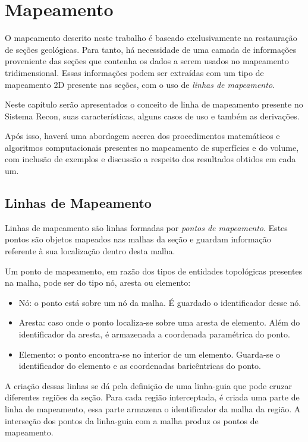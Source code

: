 
\chapter{Mapeamento}

O mapeamento descrito neste trabalho é baseado exclusivamente na restauração de seções geológicas. Para tanto, há necessidade de uma camada de informações proveniente das seções que contenha os dados a serem usados no mapeamento tridimensional. Essas informações podem ser extraídas com um tipo de mapeamento 2D presente nas seções, com o uso de \textit{linhas de mapeamento}.

Neste capítulo serão apresentados o conceito de linha de mapeamento presente no Sistema Recon, suas características, alguns casos de uso e também as derivações.

Após isso, haverá uma abordagem acerca dos procedimentos matemáticos e algoritmos computacionais presentes no mapeamento de superfícies e do volume, com inclusão de exemplos e discussão a respeito dos resultados obtidos em cada um.

\section{Linhas de Mapeamento}

Linhas de mapeamento são linhas formadas por \textit{pontos de mapeamento}. Estes pontos são objetos mapeados nas malhas da seção e guardam informação referente à sua localização dentro desta malha.

Um ponto de mapeamento, em razão dos tipos de entidades topológicas presentes na malha, pode ser do tipo nó, aresta ou elemento:

\renewcommand{\labelitemi}{•}
\begin{itemize}
  \item Nó: o ponto está sobre um nó da malha. É guardado o identificador desse nó.
  \item Aresta: caso onde o ponto localiza-se sobre uma aresta de elemento. Além do identificador da aresta, é armazenada a coordenada paramétrica do ponto.
  \item Elemento: o ponto encontra-se no interior de um elemento. Guarda-se o identificador do elemento e as coordenadas baricêntricas do ponto.
\end{itemize}

A criação dessas linhas se dá pela definição de uma linha-guia que pode cruzar diferentes regiões da seção. Para cada região interceptada, é criada uma parte de linha de mapeamento, essa parte armazena o identificador da malha da região. A interseção dos pontos da linha-guia com a malha produz os pontos de mapeamento.

